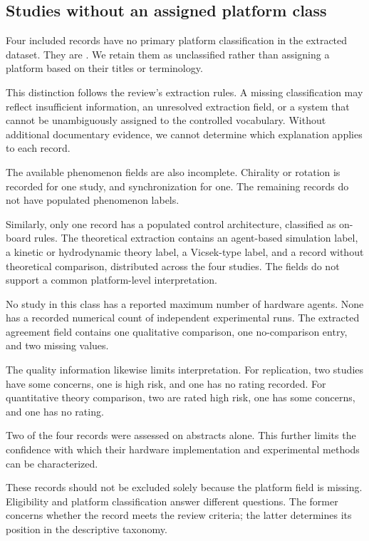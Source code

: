 \subsection{Studies without an assigned platform class}
\label{sec:platforms-unclassified}

Four included records have no primary platform
classification in the extracted dataset.
They are
\cite{Fruchart2021nonreciprocalphase,Sun2026higherorderinterac,Matari2005groupbehaviorandg,Song2016methodofquantitati}.
We retain them as unclassified rather
than assigning a platform based on
their titles or terminology.

This distinction follows the review's
extraction rules. A missing classification
may reflect insufficient information,
an unresolved extraction field,
or a system that cannot be
unambiguously assigned to the
controlled vocabulary. Without
additional documentary evidence,
we cannot determine which
explanation applies to each record.

The available phenomenon fields
are also incomplete. Chirality
or rotation is recorded for
one study, and synchronization
for one. The remaining records
do not have populated
phenomenon labels.

Similarly, only one record
has a populated control
architecture, classified
as on-board rules.
The theoretical extraction
contains an agent-based
simulation label, a kinetic
or hydrodynamic theory label,
a Vicsek-type label, and
a record without theoretical
comparison, distributed
across the four studies.
The fields do not support
a common platform-level
interpretation.

No study in this class
has a reported maximum
number of hardware agents.
None has a recorded
numerical count of
independent experimental
runs. The extracted
agreement field contains
one qualitative comparison,
one no-comparison entry,
and two missing values.

The quality information
likewise limits interpretation.
For replication, two studies
have some concerns, one
is high risk, and one
has no rating recorded.
For quantitative theory
comparison, two are
rated high risk, one
has some concerns,
and one has no rating.

Two of the four records
were assessed on abstracts
alone. This further
limits the confidence
with which their hardware
implementation and
experimental methods
can be characterized.

These records should
not be excluded solely
because the platform
field is missing.
Eligibility and platform
classification answer
different questions.
The former concerns
whether the record
meets the review
criteria; the latter
determines its position
in the descriptive
taxonomy.

